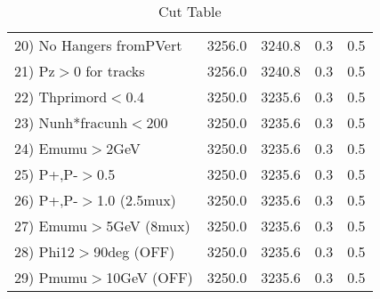 \begin{table}[h!]
\begin{tabular}{||l||r|r|r|r||}
 20) No Hangers fromPVert &      3256.0 &      3240.8 &         0.3 &         0.5 \\
 21) Pz$>$0 for tracks    &      3256.0 &      3240.8 &         0.3 &         0.5 \\
 22) Thprimord$<$0.4      &      3250.0 &      3235.6 &         0.3 &         0.5 \\
 23) Nunh*fracunh$<$200   &      3250.0 &      3235.6 &         0.3 &         0.5 \\
 24) Emumu$>$2GeV         &      3250.0 &      3235.6 &         0.3 &         0.5 \\
 25) P+,P-$>$0.5          &      3250.0 &      3235.6 &         0.3 &         0.5 \\
 26) P+,P-$>$1.0 (2.5mux) &      3250.0 &      3235.6 &         0.3 &         0.5 \\
 27) Emumu$>$5GeV  (8mux) &      3250.0 &      3235.6 &         0.3 &         0.5 \\
 28) Phi12$>$90deg  (OFF) &      3250.0 &      3235.6 &         0.3 &         0.5 \\
 29) Pmumu$>$10GeV  (OFF) &      3250.0 &      3235.6 &         0.3 &         0.5 \\
 \hline
 \hline
 \end{tabular}
 \caption{Cut Table \cohjp  }
 \label{tab-cut__jpsi}
 \end{table}
